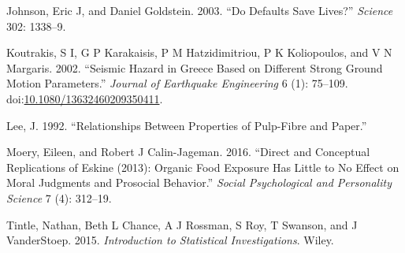 \documentclass[]{book}
\theoremstyle{definition}
\theoremstyle{definition}
\theoremstyle{definition}
\theoremstyle{remark}
\begin{document}
\hypertarget{ref-Johnson2003}{}
Johnson, Eric J, and Daniel Goldstein. 2003. ``Do Defaults Save Lives?''
\emph{Science} 302: 1338--9.

\hypertarget{ref-Koutrakis2002}{}
Koutrakis, S I, G P Karakaisis, P M Hatzidimitriou, P K Koliopoulos, and
V N Margaris. 2002. ``Seismic Hazard in Greece Based on Different Strong
Ground Motion Parameters.'' \emph{Journal of Earthquake Engineering} 6
(1): 75--109.
doi:\href{https://doi.org/10.1080/13632460209350411}{10.1080/13632460209350411}.

\hypertarget{ref-Lee1992}{}
Lee, J. 1992. ``Relationships Between Properties of Pulp-Fibre and
Paper.''

\hypertarget{ref-Moery2016}{}
Moery, Eileen, and Robert J Calin-Jageman. 2016. ``Direct and Conceptual
Replications of Eskine (2013): Organic Food Exposure Has Little to No
Effect on Moral Judgments and Prosocial Behavior.'' \emph{Social
Psychological and Personality Science} 7 (4): 312--19.

\hypertarget{ref-Tintle2015}{}
Tintle, Nathan, Beth L Chance, A J Rossman, S Roy, T Swanson, and J
VanderStoep. 2015. \emph{Introduction to Statistical Investigations}.
Wiley.
\end{document}
